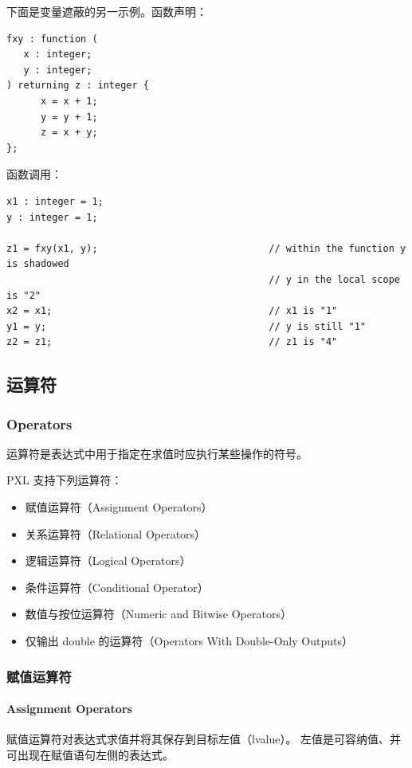 下面是变量遮蔽的另一示例。函数声明：
\begin{lstlisting}[style=pxl]
fxy : function (
   x : integer;
   y : integer;
) returning z : integer {
      x = x + 1;
      y = y + 1;
      z = x + y;
};
\end{lstlisting}

函数调用：
\begin{lstlisting}[style=pxl]
x1 : integer = 1;
y : integer = 1;

z1 = fxy(x1, y);                              // within the function y is shadowed
                                              // y in the local scope is "2"
x2 = x1;                                      // x1 is "1"
y1 = y;                                       // y is still "1"
z2 = z1;                                      // z1 is "4"
\end{lstlisting}

\subsection{运算符}
\subsubsection*{Operators}

运算符是表达式中用于指定在求值时应执行某些操作的符号。

PXL 支持下列运算符：
\begin{itemize}
  \item 赋值运算符（Assignment Operators）
  \item 关系运算符（Relational Operators）
  \item 逻辑运算符（Logical Operators）
  \item 条件运算符（Conditional Operator）
  \item 数值与按位运算符（Numeric and Bitwise Operators）
  \item 仅输出 double 的运算符（Operators With Double-Only Outputs）
\end{itemize}

\subsubsection{赋值运算符}
\paragraph*{Assignment Operators}

赋值运算符对表达式求值并将其保存到目标左值（lvalue）。
左值是可容纳值、并可出现在赋值语句左侧的表达式。

